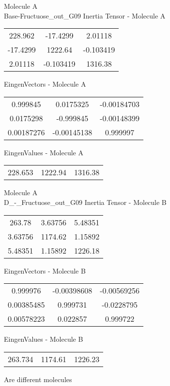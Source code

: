 \newpage
\begin{multicols}{2}
\begin{center}
Molecule A \\ 
Base-Fructuose_out_G09
Inertia Tensor - Molecule A \\
\vtab
\begin{tabular}{|c c c|}
228.962	 & 	-17.4299	 & 	2.01118	 \\
-17.4299	 & 	1222.64	 & 	-0.103419	 \\
2.01118	 & 	-0.103419	 & 	1316.38
\end{tabular}

\vtab
 EingenVectors - Molecule A     \\
\vtab
\begin{tabular}{|c c c|}
0.999845	 & 	0.0175325	 & 	-0.00184703	 \\
0.0175298	 & 	-0.999845	 & 	-0.00148399	 \\
0.00187276	 & 	-0.00145138	 & 	0.999997
\end{tabular}

\vtab
 EingenValues - Molecule A     \\
\vtab
\begin{tabular}{|c c c|}
228.653	 & 	1222.94	 & 	1316.38
\end{tabular}
\columnbreak
Molecule A \\ 
D_-_Fructuose_out_G09
Inertia Tensor - Molecule B \\
\vtab
\begin{tabular}{|c c c|}
263.78	 & 	3.63756	 & 	5.48351	 \\
3.63756	 & 	1174.62	 & 	1.15892	 \\
5.48351	 & 	1.15892	 & 	1226.18
\end{tabular}

\vtab
 EingenVectors - Molecule B     \\
\vtab
\begin{tabular}{|c c c|}
0.999976	 & 	-0.00398608	 & 	-0.00569256	 \\
0.00385485	 & 	0.999731	 & 	-0.0228795	 \\
0.00578223	 & 	0.022857	 & 	0.999722
\end{tabular}

\vtab
 EingenValues - Molecule B     \\
\vtab
\begin{tabular}{|c c c|}
263.734	 & 	1174.61	 & 	1226.23
\end{tabular}
\textcolor{NavyBlue}{\large Are different molecules}
\end{center}
\end{multicols}
